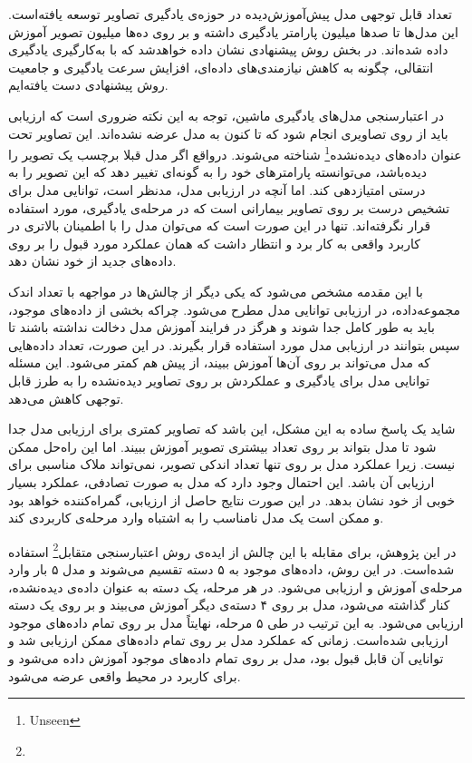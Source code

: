 تعداد قابل توجهی مدل پیش‌آموزش‌دیده در حوزه‌ی یادگیری تصاویر توسعه یافته‌است.
این مدل‌ها  تا صد‌ها میلیون پارامتر یادگیری داشته و بر روی ده‌ها میلیون تصویر آموزش داده شده‌اند. 
در بخش روش پیشنهادی نشان داده خواهد‌شد که با به‌کارگیری یادگیری انتقالی، چگونه به کاهش نیازمندی‌های داده‌ای، افزایش سرعت یادگیری و جامعیت روش پیشنهادی دست یافته‌ایم.


در اعتبار‌سنجی مدل‌های یادگیری ماشین، توجه به این نکته ضروری است که ارزیابی باید از روی تصاویری انجام شود که تا کنون به مدل عرضه نشده‌اند.
این تصاویر تحت عنوان داده‌های
 دیده‌نشده\footnote{Unseen}
 شناخته می‌شوند.
درواقع
اگر مدل قبلا برچسب یک تصویر را دیده‌باشد، می‌توانسته پارامتر‌های خود را به گونه‌ای تغییر دهد که این تصویر را به درستی امتیازدهی کند.
اما آنچه در ارزیابی مدل، مدنظر است، توانایی مدل برای تشخیص درست بر روی تصاویر بیمارانی است که در مرحله‌ی یادگیری، مورد استفاده قرار نگرفته‌اند.
تنها در این صورت است که می‌توان مدل را با اطمینان بالاتری در کاربرد واقعی به کار برد و انتظار داشت که همان عملکرد مورد قبول را بر روی داده‌های جدید از خود نشان دهد.

با این مقدمه مشخص می‌شود که
یکی دیگر از چالش‌ها در مواجهه با تعداد اندک مجموعه‌داده، در ارزیابی توانایی مدل مطرح می‌شود.
چراکه بخشی از داده‌های موجود، باید به طور کامل جدا شوند و هرگز در فرایند آموزش مدل دخالت نداشته باشند تا سپس بتوانند در ارزیابی مدل مورد استفاده قرار بگیرند.
در این صورت، تعداد داده‌هایی که مدل می‌تواند بر روی آن‌ها آموزش ببیند، از پیش هم کمتر می‌شود.
این مسئله توانایی مدل برای یادگیری و عملکردش بر روی تصاویر دیده‌نشده را به طرز قابل توجهی کاهش می‌دهد.

شاید یک پاسخ ساده به این مشکل، این باشد که تصاویر کمتری برای ارزیابی مدل جدا شود تا مدل بتواند بر روی تعداد بیشتری تصویر آموزش ببیند.
اما این راه‌حل ممکن نیست.
زیرا عملکرد مدل بر روی تنها تعداد اندکی تصویر، نمی‌تواند ملاک مناسبی برای ارزیابی آن باشد.
این احتمال وجود دارد که مدل به صورت تصادفی، عملکرد بسیار خوبی از خود نشان بدهد.
در این صورت نتایج حاصل از ارزیابی،‌ گمراه‌کننده خواهد بود و ممکن است یک مدل نامناسب را به اشتباه وارد مرحله‌ی کاربردی کند.

در این پژوهش، برای مقابله با این چالش از ایده‌ی روش
اعتبارسنجی متقابل\footnote{}
استفاده شده‌است.
در این روش،
داده‌های موجود به ۵ دسته تقسیم می‌شوند و مدل ۵ بار وارد مرحله‌ی آموزش و ارزیابی می‌شود.
در هر مرحله، یک دسته به عنوان داده‌ی دیده‌نشده، کنار گذاشته می‌شود، مدل بر روی ۴ دسته‌ی دیگر آموزش می‌بیند و بر روی یک دسته ارزیابی می‌شود. 
به این ترتیب در طی ۵ مرحله، نهایتاً مدل بر روی تمام داده‌های موجود ارزیابی شده‌است.
زمانی که عملکرد مدل بر روی تمام داده‌های ممکن ارزیابی شد و توانایی آن قابل قبول بود، مدل بر روی تمام داده‌های موجود آموزش داده‌ می‌شود و برای کاربرد در محیط واقعی عرضه می‌شود.

